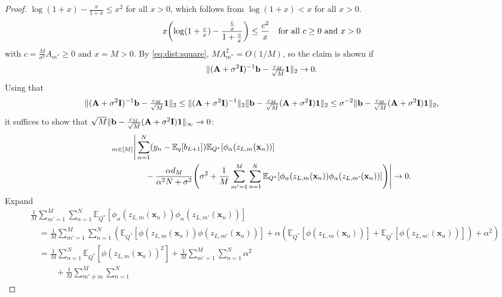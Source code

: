 \documentclass[twoside]{article}
\newcommand{\vb}{\mathbf{b}}
\newcommand{\vx}{\mathbf{x}}
\newcommand{\vone}{\mathbf{1}}
\newcommand{\mA}{\mathbf{A}}
\newcommand{\mI}{\mathbf{I}}
\newcommand{\E}{\mathbb{E}}
\newcommand{\opspace}{}
\let\max\relax\DeclareMathOperator*{\max}{max\opspace}
\DeclarePairedDelimiter\parens{(}{)}             %
\DeclarePairedDelimiter\norm{\|}{\|}             %
\theoremstyle{theoremstyle}
\begin{document}
\begin{proof}
{        $
            \log(1 + x) - \frac{x}{1 + x} \le x^2
        $
        for all $x > 0$, which follows from $\log(1 + x) < x$ for all $x > 0$.
    }
    \begin{equation}
        x \parens*{\log(1 + \tfrac{c}{x}) - \frac{\tfrac{c}{x}}{1+\tfrac{c}{x}}} \le \frac{c^2}{x}
        \quad 
        \text{for all $c \ge 0$ and $x > 0$}
    \end{equation}
    with $c = \tfrac{M}{\sigma^2}A_{m^*} \ge 0$ and $x = M > 0$.
    By \cref{eq:dist:square}, $M A^2_{m^*} = O(1/M)$, so the claim is shown if
    \begin{equation}
        \norm{(\mA + \sigma^2 \mI)^{-1} \vb - \tfrac{c_M}{\sqrt{M}} \vone}_2 \to 0.
    \end{equation}
    Using that
    \begin{equation}
        \norm{(\mA + \sigma^2 \mI)^{-1} \vb - \tfrac{c_M}{\sqrt{M}} \vone}_2
        \le \norm{(\mA + \sigma^2 \mI)^{-1}}_2 \norm{\vb - \tfrac{c_M}{\sqrt{M}} (\mA + \sigma^2 \mI)\vone}_2
        \le \sigma^{-2} \norm{\vb - \tfrac{c_M}{\sqrt{M}} (\mA + \sigma^2 \mI)\vone}_2,
    \end{equation}
    it suffices to show that
    $\sqrt{M}\norm{\vb - \tfrac{c_M}{\sqrt{M}} (\mA + \sigma^2 \mI)\vone}_\infty \to 0$:
    \begin{align}
        &\max_{m \in [M]} \Bigg| \sum_{n=1}^N(y_n - \E_q[b_{L+1}])\E_{Q^*}[\phi_\alpha(z_{L,m}(\vx_n))] \\
        &\qquad\qquad- \frac{\alpha d_M}{\alpha^2 N + \sigma^2}
        \parens*{\sigma^2 +\frac1M\sum_{m'=1}^M \sum_{n=1}^N \E_{Q^*}[\phi_\alpha(z_{L,m}(\vx_n))\phi_\alpha(z_{L,m'}(\vx_n))]}\Bigg| \to 0. \nonumber
    \end{align}
    Expand
    \begin{align}
        &\frac1M\sum_{m'=1}^M \sum_{n=1}^N \E_{Q^*}[\phi_\alpha(z_{L,m}(\vx_n))\phi_\alpha(z_{L,m'}(\vx_n))] \nonumber \\
        &\quad= 
            \frac1M\sum_{m'=1}^M \sum_{n=1}^N
            (
                \E_{Q^*}[\phi(z_{L,m}(\vx_n)) \phi(z_{L,m'}(\vx_n))]
                + \alpha( \E_{Q^*}[\phi(z_{L,m}(\vx_n))] + \E_{Q^*}[\phi(z_{L,m'}(\vx_n))]) + \alpha^2
            ) \\
        &\quad= 
            \frac1M\sum_{n=1}^N
                \E_{Q^*}[\phi(z_{L,m}(\vx_n))^2]
                 + \frac1M\sum_{m'=1}^M \sum_{n=1}^N \alpha^2
             \\
        &\quad\qquad
        + \frac1M\sum_{m'\neq m}^M \sum_{n=1}^N

\end{align}
\end{proof}
\end{document}
